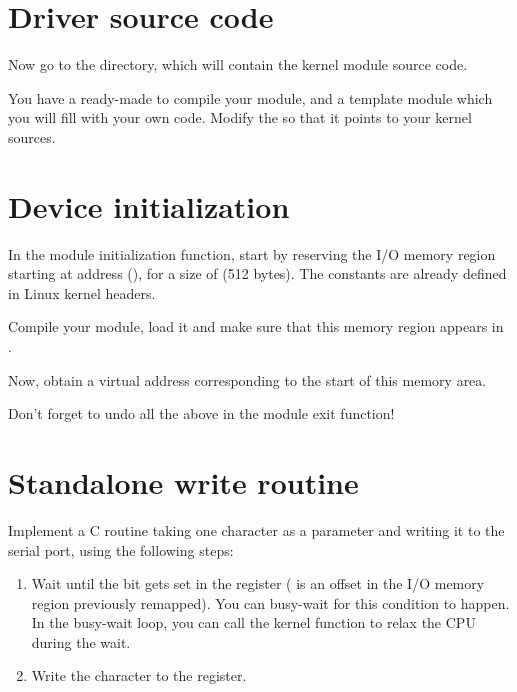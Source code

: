 \section{Driver source code}

Now go to the  directory, which will contain the
kernel module source code.

You have a ready-made  to compile your module, and a
template  module which you will fill with your own
code. Modify the  so that it points to your kernel sources.

\section{Device initialization}

In the module initialization function, start by reserving the I/O
memory region starting at address (), for a
size of  (512 bytes). The  constants are already defined
in Linux kernel headers.

Compile your module, load it and make sure that this memory region
appears in .

Now, obtain a virtual address corresponding to the start of this
memory area.

Don't forget to undo all the above in the module exit function!

\section{Standalone write routine}

Implement a C routine taking one character as a parameter and writing
it to the serial port, using the following steps:

\begin{enumerate}

 \item Wait until the  bit gets set in
 the  register ( is an
 offset in the I/O memory region previously remapped). You can
 busy-wait for this condition to happen. In the busy-wait loop, you
 can call the  kernel function to relax the CPU
 during the wait.

 \item Write the character to the  register.

\end{enumerate}


